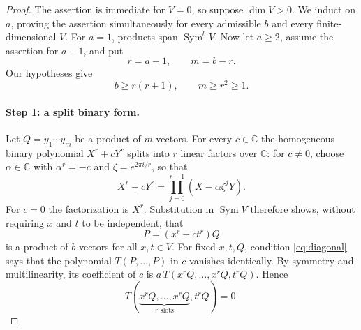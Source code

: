 \documentclass[11pt]{article}
\theoremstyle{remark}
\DeclareMathOperator{\Sym}{Sym}
\newcommand{\C}{\mathbb C}
\begin{document}
\begin{proof}
The assertion is immediate for $V=0$, so suppose $\dim V>0$.
We induct on $a$, proving the assertion simultaneously for every admissible
$b$ and every finite-dimensional $V$. For $a=1$, products span $\Sym^b V$.
Now let $a\ge2$, assume the assertion for $a-1$, and put
\begin{equation}\label{eq:rm}
 r=a-1,\qquad m=b-r.
\end{equation}
Our hypotheses give
\begin{equation}\label{eq:range}
 b\ge r(r+1),\qquad m\ge r^2\ge1.
\end{equation}

\paragraph{Step 1: a split binary form.}
Let $Q=y_1\cdots y_m$ be a product of $m$ vectors. For every $c\in\C$
the homogeneous binary polynomial $X^r+cY^r$ splits into $r$ linear
factors over $\C$: for $c\ne0$, choose $\alpha\in\C$ with $\alpha^r=-c$ and
$\zeta=e^{2\pi i/r}$, so that
\[
 X^r+cY^r=\prod_{j=0}^{r-1}(X-\alpha\zeta^jY).
\]
For $c=0$ the factorization is $X^r$. Substitution in $\Sym V$ therefore
shows, without requiring $x$ and $t$ to be independent, that
\[
 P=(x^r+ct^r)Q
\]
is a product of $b$ vectors for all $x,t\in V$. For fixed $x,t,Q$,
condition \eqref{eq:diagonal} says that the polynomial $T(P,\ldots,P)$
in $c$ vanishes identically. By symmetry and multilinearity, its
coefficient of $c$ is
$a\,T(x^rQ,\ldots,x^rQ,t^rQ)$. Hence
\begin{equation}\label{eq:binary}
 T(\underbrace{x^rQ,\ldots,x^rQ}_{r\text{ slots}},t^rQ)=0.
\end{equation}


\end{proof}
\end{document}
